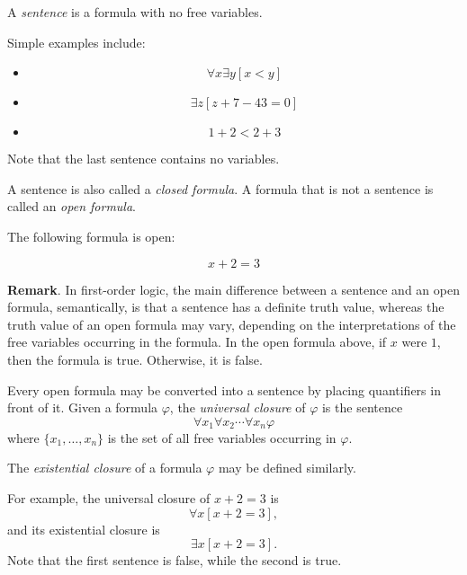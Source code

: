 \documentclass[12pt]{article}
\begin{document}
A \emph{sentence} is a formula with no free variables.

Simple examples include:

\begin{itemize}
\item
$$\forall x\exists y [x<y]$$
\item
$$\exists z [z+7-43=0]$$
\item
$$1+2<2+3$$
\end{itemize}

Note that the last sentence contains no variables.

A sentence is also called a \emph{closed formula}.  A formula that is not a sentence is called an \emph{open formula}.

The following formula is open:

$$x+2=3$$

\textbf{Remark}.  In first-order logic, the main difference between a sentence and an open formula, semantically, is that a sentence has a definite truth value, whereas the truth value of an open formula may vary, depending on the interpretations of the free variables occurring in the formula.  In the open formula above, if $x$ were $1$, then the formula is true.  Otherwise, it is false.

Every open formula may be converted into a sentence by placing quantifiers in front of it.  Given a formula $\varphi$, the \emph{universal closure} of $\varphi$ is the sentence $$\forall x_1 \forall x_2 \cdots \forall x_n \varphi$$
where $\lbrace x_1,\ldots, x_n\rbrace$ is the set of all free variables occurring in $\varphi$.

The \emph{existential closure} of a formula $\varphi$ may be defined similarly.

For example, the universal closure of $x+2=3$ is $$\forall x [x+2=3],$$ and its existential closure is $$\exists x [x+2=3].$$  Note that the first sentence is false, while the second is true.
\end{document}
